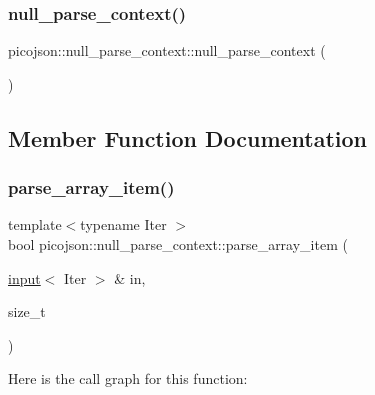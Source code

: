 \subsubsection{\texorpdfstring{null\+\_\+parse\+\_\+context()}{null\_parse\_context()}}
{\footnotesize\ttfamily picojson\+::null\+\_\+parse\+\_\+context\+::null\+\_\+parse\+\_\+context (\begin{DoxyParamCaption}{ }\end{DoxyParamCaption})\hspace{0.3cm}{\ttfamily [inline]}}



\subsection{Member Function Documentation}
\hypertarget{classpicojson_1_1null__parse__context_a6623f92117dd6dc7bca60e9e9463a1a0}{}\label{classpicojson_1_1null__parse__context_a6623f92117dd6dc7bca60e9e9463a1a0} 
\subsubsection{\texorpdfstring{parse\+\_\+array\+\_\+item()}{parse\_array\_item()}}
{\footnotesize\ttfamily template$<$typename Iter $>$ \\
bool picojson\+::null\+\_\+parse\+\_\+context\+::parse\+\_\+array\+\_\+item (\begin{DoxyParamCaption}\item[{\hyperlink{classpicojson_1_1input}{input}$<$ Iter $>$ \&}]{in,  }\item[{size\+\_\+t}]{ }\end{DoxyParamCaption})\hspace{0.3cm}{\ttfamily [inline]}}

Here is the call graph for this function\+:
\hypertarget{classpicojson_1_1null__parse__context_ae78f8991e157a85b7ce0fb36f9a5f628}{}\label{classpicojson_1_1null__parse__context_ae78f8991e157a85b7ce0fb36f9a5f628} 
